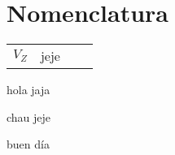 \documentclass[11pt,a4paper]{article}
\begin{document}
	\pagestyle{pieyencabezado}
	\section*{Nomenclatura}
	
	\begin{tabular}{r l r l}
		$V_Z$ & jeje &&\\
	\end{tabular}
	\begin{multicols}{2}
		\begin{cajita}
			hola jaja
		\end{cajita}
		
		
		\begin{cajita}
			chau jeje
		\end{cajita}
	\end{multicols}

	\begin{cajita}
		buen día
	\end{cajita}

	
\end{document}
